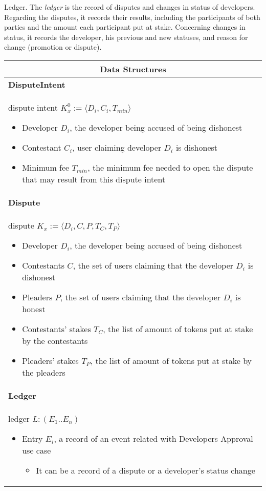 \noindent \textsf{Ledger}. The \textit{ledger} is the record of disputes and changes in status of developers. Regarding the disputes, it records their results, including the participants of both parties and the amount each participant put at stake. Concerning changes in status, it records the developer, his previous and new statuses, and reason for change (promotion or dispute).

\begin{table}[H]
\footnotesize
\centering
\begin{tabular}{|p{}|}
\hline
\multicolumn{1}{|c|}{Data Structures} \\
\hline \vspace{0.05cm}
\textbf{DisputeIntent} \\
dispute intent $K^{0}_{x} := \langle D_i, C_i, T_{min}\rangle$
\begin{itemize}
	\item Developer $D_i$, the developer being accused of being dishonest
	\item Contestant $C_i$, user claiming developer $D_i$ is dishonest
	\item Minimum fee $T_{min}$, the minimum fee needed to open the dispute that may result from this dispute intent
\end{itemize} \\
\textbf{Dispute} \\
dispute $K_x := \langle D_i, C, P, T_C, T_P\rangle$
\begin{itemize}
	\item Developer $D_i$, the developer being accused of being dishonest
	\item Contestants $C$, the set of users claiming that the developer $D_i$ is dishonest
	\item Pleaders $P$, the set of users claiming that the developer $D_i$ is honest
	\item Contestants' stakes $T_C$, the list of amount of tokens put at stake by the contestants
	\item Pleaders' stakes $T_P$, the list of amount of tokens put at stake by the pleaders
\end{itemize} \\
\textbf{Ledger} \\
ledger $L : (E_1..E_n)$
\begin{itemize}
	\item Entry $E_i$, a record of an event related with Developers Approval use case
	\begin{itemize}
		\item It can be a record of a dispute or a developer's status change

\end{itemize}
\end{itemize}
\end{tabular}
\end{table}
